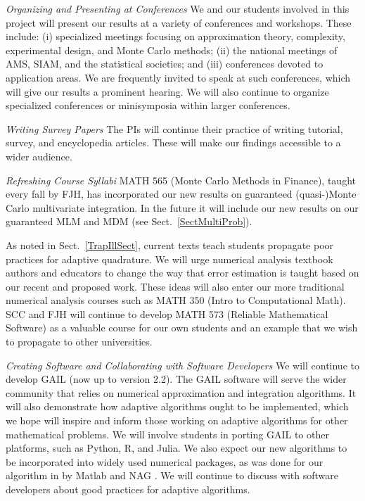 \documentclass[11pt]{NSFamsart}
\newcommand{\Matlab}{{\sc Matlab}\xspace}
\begin{document}
\emph{Organizing and Presenting at Conferences}
We and our students involved in this project will present our results at a variety of conferences and 
workshops.  These include: (i) specialized meetings focusing on approximation theory, complexity, 
experimental design, and Monte Carlo methods; (ii) the national meetings of AMS, SIAM, and the 
statistical societies; and (iii) conferences devoted to application areas.  We are frequently invited to 
speak at such conferences, which will give our results a prominent hearing. We will also continue to 
organize specialized conferences or minisymposia within larger conferences.

\emph{Writing Survey Papers}
The PIs will continue their practice of writing tutorial, survey, and encyclopedia articles.  These will 
make our findings accessible to a wider audience.

\emph{Refreshing Course Syllabi}
MATH 565 (Monte Carlo Methods in Finance), taught every fall by FJH, has incorporated our new 
results on guaranteed (quasi-)Monte Carlo multivariate integration. In the future it will include our 
new results on our guaranteed MLM and MDM (see Sect.\ \ref{SectMultiProb}).

As noted in Sect.\ \ref{TrapIllSect}, current texts teach students propagate poor practices for 
adaptive quadrature.  We will urge numerical analysis textbook authors and educators to change the 
way that error estimation is taught based on our recent and proposed work.  These ideas will also 
enter our more traditional numerical analysis courses such as MATH 350 (Intro to Computational 
Math).  SCC and FJH will continue to develop MATH 573 (Reliable Mathematical Software) as a 
valuable course for our own students and an example that we wish to propagate to other 
universities.

\emph{Creating Software and Collaborating with Software Developers}
We will continue to develop GAIL \citep{ChoEtal17b} (now up to version 2.2).  The GAIL software will 
serve the wider community that relies on numerical approximation and integration algorithms.  It will 
also demonstrate how adaptive algorithms ought to be implemented, which we hope will inspire and 
inform those working on adaptive algorithms for other mathematical problems.  We will involve 
students in porting GAIL to other platforms, such as Python, R, and Julia.  We also expect our 
new algorithms to be incorporated into widely used numerical packages, as was done for our 
algorithm in \cite{HonHic00a} by \Matlab \citep{MAT8.4} and NAG \citep{NAG23}.  We will continue 
to discuss with software developers about good practices for adaptive algorithms.
\end{document}
